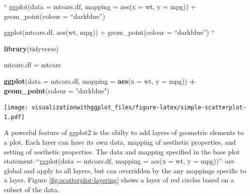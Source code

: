 \documentclass[]{krantz}
\makeatletter
\newenvironment{Shaded}{\begin{snugshade}}{\end{snugshade}}
\newcommand{\KeywordTok}[1]{\textcolor[rgb]{0.13,0.29,0.53}{\textbf{#1}}}
\newcommand{\DataTypeTok}[1]{\textcolor[rgb]{0.13,0.29,0.53}{#1}}
\newcommand{\DecValTok}[1]{\textcolor[rgb]{0.00,0.00,0.81}{#1}}
\newcommand{\StringTok}[1]{\textcolor[rgb]{0.31,0.60,0.02}{#1}}
\newcommand{\OperatorTok}[1]{\textcolor[rgb]{0.81,0.36,0.00}{\textbf{#1}}}
\newcommand{\NormalTok}[1]{#1}
\newenvironment{kframe}{%
\medskip{}
\setlength{\fboxsep}{.8em}
 \def\at@end@of@kframe{}%
 \ifinner\ifhmode%
  \def\at@end@of@kframe{\end{minipage}}%
  \begin{minipage}{\columnwidth}%
 \fi\fi%
 \def\FrameCommand##1{\hskip\@totalleftmargin \hskip-\fboxsep
 \colorbox{shadecolor}{##1}\hskip-\fboxsep
     \hskip-\linewidth \hskip-\@totalleftmargin \hskip\columnwidth}%
 \MakeFramed {\advance\hsize-\width
   \@totalleftmargin\z@ \linewidth\hsize
   \@setminipage}}%
 {\par\unskip\endMakeFramed%
 \at@end@of@kframe}
\renewenvironment{Shaded}{\begin{kframe}}{\end{kframe}}
\theoremstyle{definition}
\theoremstyle{definition}
\theoremstyle{definition}
\theoremstyle{remark}
\makeatother
\begin{document}
`` ggplot(data = mtcars.df, mapping = aes(x = wt, y = mpg)) +
geom\_point(colour = ``darkblue'')

ggplot(mtcars.df, aes(wt, mpg)) + geom\_point(colour = ``darkblue'') ``

\begin{Shaded}
\begin{Highlighting}[]
\KeywordTok{library}\NormalTok{(tidyverse)}

\NormalTok{mtcars.df =}\StringTok{ }\NormalTok{mtcars}

\KeywordTok{ggplot}\NormalTok{(}\DataTypeTok{data =}\NormalTok{ mtcars.df, }\DataTypeTok{mapping =} \KeywordTok{aes}\NormalTok{(}\DataTypeTok{x =}\NormalTok{ wt, }\DataTypeTok{y =}\NormalTok{ mpg)) }\OperatorTok{+}
\StringTok{  }\KeywordTok{geom_point}\NormalTok{(}\DataTypeTok{colour =} \StringTok{"darkblue"}\NormalTok{)}
\end{Highlighting}
\end{Shaded}

\texttt{[image: visualizationwithggplot\_files/figure-latex/simple-scatterplot-1.pdf]}

A powerful feature of ggplot2 is the abilty to add layers of geometric
elements to a plot. Each layer can have its own data, mapping of
aesthetic properties, and setting of aesthetic properties. The data and
mapping specified in the base plot statement--``ggplot(data = mtcars.df,
mapping = aes(x = wt, y = mpg))''--are global and apply to all layers,
but can overridden by the any mappings specific to a layer. Figure
\ref{fig:scatterplot-layering} shows a layer of red circles based on a
subset of the data.

\begin{Shaded}
\end{Shaded}
\end{document}
